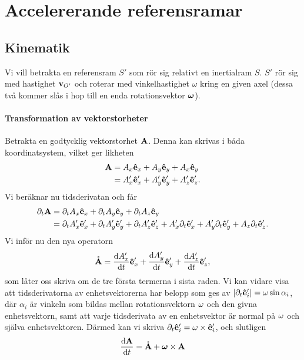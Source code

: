 \section{Accelererande referensramar}

\subsection{Kinematik}

Vi vill betrakta en referensram $S'$ som rör sig relativt en inertialram $S$. $S'$ rör sig med hastighet $\vb{v}_{O'}$ och roterar med vinkelhastighet $\omega$ kring en given axel (dessa två kommer slås i hop till en enda rotationsvektor $\vb*{\omega}$).

\paragraph{Transformation av vektorstorheter}
Betrakta en godtycklig vektorstorhet $\vb{A}$. Denna kan skrivas i båda koordinatsystem, vilket ger likheten
\begin{align*}
	\vb{A} &= A_{x}\vu{e}_{x} + A_{y}\vu{e}_{y} + A_{x}\vu{e}_{y} \\
	       &= A_{x}'\vu{e}_{x}' + A_{y}'\vu{e}_{y}' + A_{z}'\vu{e}_{z}'.
\end{align*}
Vi beräknar nu tidsderivatan och får
\begin{align*}
	\partial_{t}\vb{A} &= \partial_{t}A_{x}\vu{e}_{x} + \partial_{t}A_{y}\vu{e}_{y} + \partial_{t}A_{z}\vu{e}_{y} \\
	       &= \partial_{t}A_{x}'\vu{e}_{x}' + \partial_{t}A_{y}'\vu{e}_{y}' + \partial_{t}A_{z}'\vu{e}_{z}' + A_{x}'\partial_{t}\vu{e}_{x}' + A_{y}'\partial_{t}\vu{e}_{y}' + A_{z}\partial_{t}\vu{e}_{z}'.
\end{align*}
Vi inför nu den nya operatorn
\begin{align*}
	\mathring{\vb{A}} = \dv{A_{x}'}{t}\vu{e}_{x}' + \dv{A_{y}'}{t}\vu{e}_{y}' + \dv{A_{z}'}{t}\vu{e}_{z}',
\end{align*}
som låter oss skriva om de tre första termerna i sista raden. Vi kan vidare visa att tidsderivatorna av enhetsvektorerna har belopp som ges av $\abs{\partial_{t}\vu{e}_{i}'} = \omega\sin{\alpha_i}$, där $\alpha_i$ är vinkeln som bildas mellan rotationsvektorn $\vb{\omega}$ och den givna enhetsvektorn, samt att varje tidsderivata av en enhetsvektor är normal på $\vb{\omega}$ och själva enhetsvektoren. Därmed kan vi skriva $\partial_{t}\vu{e}_{i}' = \vb{\omega}\times\vu{e}_{i}'$, och slutligen
\begin{align}
	\dv{\vb{A}}{t} = \mathring{\vb{A}} + \vb*{\omega}\times\vb{A}
	\label{eq:relderiv}
\end{align}

